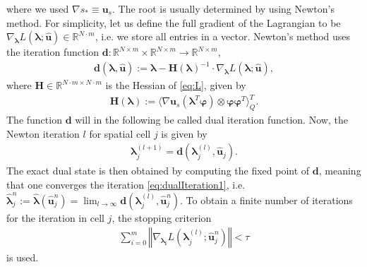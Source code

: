 where we used $\nabla s_* \equiv \bm u_s$. The root is usually determined by using Newton's method. For simplicity, let us define the full gradient of the Lagrangian to be $\nabla_{\bm{\lambda}}L(\bm{\lambda};\bm{\hat{u}})\in\mathbb{R}^{N\cdot m}$, i.e. we store all entries in a vector. Newton's method uses the iteration function $\bm{d}:\mathbb{R}^{N\times m}\times\mathbb{R}^{N\times m}\to\mathbb{R}^{N\times m}$,
\begin{align}\label{eq:dualIterationFunction}
\bm{d}(\bm{\lambda},\bm{\hat{u}}):= \bm{\lambda}-\bm{H}(\bm{\lambda})^{-1}\cdot\nabla_{\bm{\lambda}}L(\bm{\lambda};\bm{\hat{u}}),
\end{align}
where $\bm H\in\mathbb{R}^{N \cdot m\times N\cdot m}$ is the Hessian of \eqref{eq:L}, given by
\begin{align*}
\bm{H}(\bm{\lambda}) := \langle \nabla \bm{u}_{s} (\bm{\lambda}^T\bm{\varphi})\otimes\bm{\varphi}\bm{\varphi}^T\rangle_Q^{T}.
\end{align*}
The function $\bm d$ will in the following be called dual iteration function. Now, the Newton iteration $l$ for spatial cell $j$ is given by
\begin{align}\label{eq:dualIteration1}
\bm{\lambda}^{(l+1)}_j = \bm{d}(\bm{\lambda}_j^{(l)},\bm{\hat{u}}_j).
\end{align}
The exact dual state is then obtained by computing the fixed point of $\bm{d}$, meaning that one converges the iteration \eqref{eq:dualIteration1}, i.e. $\bm{\hat\lambda}_j^n:=\bm{\hat\lambda}(\bm{\hat u}_j^n)=\lim_{l\rightarrow\infty}\bm{d}(\bm{\lambda}_j^{(l)},\bm{\hat{u}}_j^n)$.
To obtain a finite number of iterations for the iteration in cell $j$, the stopping criterion 
\begin{align}\label{eq:tauCrit}
\sum_{i=0}^m\left\Vert \nabla_{\bm{\lambda_i}}L(\bm{\lambda}_j^{(l)};\bm{\hat{u}}_j^n) \right\Vert < \tau
\end{align}
is used.

